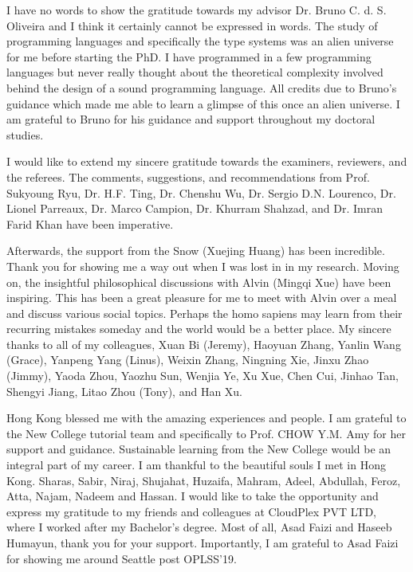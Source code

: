 

I have no words to show the gratitude towards my
advisor Dr. Bruno C. d. S. Oliveira and I think it 
certainly cannot be expressed in words.
The study of programming languages
and specifically the type systems was an alien universe 
for me before starting the PhD.
I have programmed in a few programming languages but never
really thought about the theoretical complexity involved
behind the design of a sound programming language.
All credits due to Bruno's guidance which made me able to
learn a glimpse of this once an alien universe.
I am grateful to Bruno for his
guidance and support throughout my doctoral studies.

I would like to extend my sincere gratitude towards the examiners,
reviewers, and the referees. The comments, suggestions,
and recommendations from Prof. Sukyoung Ryu, Dr. H.F. Ting, Dr. Chenshu Wu,
Dr. Sergio D.N. Lourenco, Dr. Lionel Parreaux, Dr. Marco Campion,
Dr. Khurram Shahzad, and Dr. Imran Farid Khan have been imperative.

Afterwards, the support from the Snow (Xuejing Huang) has
been incredible. Thank you for showing me a way out when I was
lost in in my research.
Moving on, the insightful philosophical
discussions with Alvin (Mingqi Xue) have been inspiring.
This has been a great pleasure for me to meet
with Alvin over a meal and discuss various social topics.
Perhaps the homo sapiens may learn from their recurring
mistakes someday and the world would be a better place.
My sincere thanks to all of my colleagues, Xuan Bi (Jeremy),
Haoyuan Zhang, Yanlin Wang (Grace), Yanpeng Yang (Linus),
Weixin Zhang, Ningning Xie, Jinxu Zhao (Jimmy), Yaoda Zhou,
Yaozhu Sun, Wenjia Ye, Xu Xue, Chen Cui, Jinhao Tan, Shengyi Jiang,
Litao Zhou (Tony), and Han Xu.

Hong Kong blessed me with the amazing experiences and people.
I am grateful to the New College tutorial team and specifically
to Prof. CHOW Y.M. Amy for her support and guidance.
Sustainable learning from the New College would
be an integral part of my career.
I am thankful to the beautiful souls I
met in Hong Kong. Sharas, Sabir, Niraj, Shujahat, Huzaifa,
Mahram, Adeel, Abdullah, Feroz, Atta, Najam, Nadeem and Hassan.
I would like to take the opportunity and express my
gratitude to my friends and colleagues at CloudPlex PVT LTD, where I 
worked after my Bachelor's degree. Most of all, Asad Faizi 
and Haseeb Humayun, thank you for your support.
Importantly, I am grateful to Asad Faizi for showing
me around Seattle post OPLSS'19.

